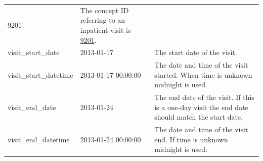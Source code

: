 \documentclass[11pt]{book}
\theoremstyle{definition}
\theoremstyle{definition}
\theoremstyle{definition}
\theoremstyle{remark}
\begin{document}
\begin{longtable}[]{@{}lll@{}}
\begin{minipage}[t]{0.15\columnwidth}
9201\strut
\end{minipage} & \begin{minipage}[t]{0.49\columnwidth}\raggedright
The concept ID referring to an inpatient visit is \href{http://athena.ohdsi.org/search-terms/terms/9201}{9201}.\strut
\end{minipage}\tabularnewline
\begin{minipage}[t]{0.28\columnwidth}\raggedright
visit\_start\_date\strut
\end{minipage} & \begin{minipage}[t]{0.15\columnwidth}\raggedright
2013-01-17\strut
\end{minipage} & \begin{minipage}[t]{0.49\columnwidth}\raggedright
The start date of the visit.\strut
\end{minipage}\tabularnewline
\begin{minipage}[t]{0.28\columnwidth}\raggedright
visit\_start\_datetime\strut
\end{minipage} & \begin{minipage}[t]{0.15\columnwidth}\raggedright
2013-01-17 00:00:00\strut
\end{minipage} & \begin{minipage}[t]{0.49\columnwidth}\raggedright
The date and time of the visit started. When time is unknown midnight is used.\strut
\end{minipage}\tabularnewline
\begin{minipage}[t]{0.28\columnwidth}\raggedright
visit\_end\_date\strut
\end{minipage} & \begin{minipage}[t]{0.15\columnwidth}\raggedright
2013-01-24\strut
\end{minipage} & \begin{minipage}[t]{0.49\columnwidth}\raggedright
The end date of the visit. If this is a one-day visit the end date should match the start date.\strut
\end{minipage}\tabularnewline
\begin{minipage}[t]{0.28\columnwidth}\raggedright
visit\_end\_datetime\strut
\end{minipage} & \begin{minipage}[t]{0.15\columnwidth}\raggedright
2013-01-24 00:00:00\strut
\end{minipage} & \begin{minipage}[t]{0.49\columnwidth}\raggedright
The date and time of the visit end. If time is unknown midnight is used.\strut
\end{minipage}\tabularnewline

\end{longtable}
\end{document}

